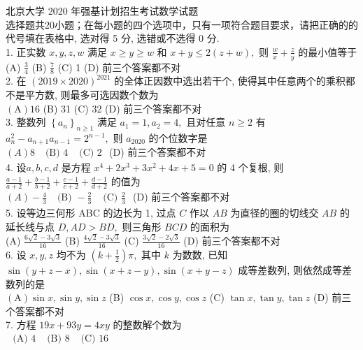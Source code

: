 
北京大学 2020 年强基计划招生考试数学试题\\
选择题共20小题；在每小题的四个选项中，只有一项符合题目要求，请把正确的的代号填在表格中, 选对得 5 分, 选错或不选得 0 分.\\
1. 正实数 $x, y, z, w$ 满足 $x \geq y \geq w$ 和 $x+y \leq 2(z+w),$ 则 $\frac{w}{x}+\frac{z}{y}$ 的最小值等于\\
(A) $\frac{3}{4}$
(B) $\frac{7}{8}$
(C) 1
(D) 前三个答案都不对\\
2. 在 $(2019 \times 2020)^{2021}$ 的全体正因数中选出若干个, 使得其中任意两个的乘积都不是平方数, 则最多可选因数个数为\\
$(\mathrm{A}) 16$
(B) 31
(C) 32
(D) 前三个答案都不对\\
3. 整数列 $\left\{a_{n}\right\}_{n \geq 1}$ 满足 $a_{1}=1, a_{2}=4,$ 且对任意 $n \geq 2$ 有 $a_{n}^{2}-a_{n+1} a_{n-1}=2^{n-1},$ 则 $a_{2020}$ 的个位数字是\\
$(A) 8$
$\begin{array}{ll}\text { (B) } 4 & \text { (C) } 2\end{array}$
(D) 前三个答案都不对\\
4. 设$a, b, c, d$ 是方程 $x^{4}+2 x^{3}+3 x^{2}+4 x+5=0$ 的 4 个复根, 则 $\frac{a-1}{a+2}+\frac{b-1}{b+2}+\frac{c-1}{c+2}+\frac{d-1}{d+2}$
的值为\\
$(A)-\frac{4}{3}$
$\begin{array}{ll}\text { (B) }-\frac{2}{3} & \text { (C) } \frac{2}{3}\end{array}$
(D) 前三个答案都不对\\
5. 设等边三何形 ABC 的边长为 1, 过点 $C$ 作以 $A B$ 为直径的圈的切线交 $A B$ 的延长线与点 $D, A D>B D,$ 则三角形 $B C D$ 的面积为\\
(A) $\frac{6 \sqrt{2}-3 \sqrt{3}}{16}$
(B) $\frac{4 \sqrt{2}-3 \sqrt{3}}{16}$
(C) $\frac{3 \sqrt{2}-2 \sqrt{3}}{16}$
(D) 前三个答案都不对\\
6. 设 $x, y, z$ 均不为 $\left(k+\frac{1}{2}\right) \pi,$ 其中 $k$ 为数数, 已知$\sin (y+z-x), \sin (x+z-y), \sin (x+
y-z )$ 成等差数列, 则依然成等差数列的是\\
$(\mathrm{A}) \sin x, \sin y, \sin z$
(B) $\cos x, \cos y, \cos z$
(C) $\tan x, \tan y, \tan z$
(D) 前三个答案都不对\\
7. 方程 $19 x+93 y=4 x y$ 的整数解个数为\\
$\begin{array}{lll}\text { (A) } 4 & \text { (B) } 8 & \text { (C) } 16\end{array}$
